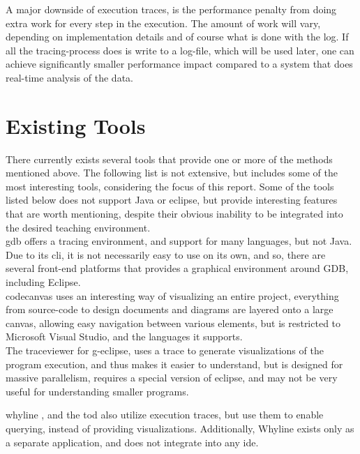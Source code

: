 A major downside of execution traces, is the performance penalty from doing extra work for every step in the execution.
The amount of work will vary, depending on implementation details and of course what is done with the log.
If all the tracing-process does is write to a log-file, which will be used later, one can achieve significantly smaller performance impact compared to a system that does real-time analysis of the data.
~\\

\section{Existing Tools}\label{PreTools}
There currently exists several tools that provide one or more of the methods mentioned above.
The following list is not extensive, but includes some of the most interesting tools, considering the focus of this report.
Some of the tools listed below does not support Java or eclipse, but provide interesting features that are worth mentioning, despite their obvious inability to be integrated into the desired teaching environment.
~\\

\gls{gdb} offers a tracing environment, and support for many languages, but not Java.
Due to its \gls{cli}, it is not necessarily easy to use on its own, and so, there are several front-end platforms that provides a graphical environment around GDB, including Eclipse.
~\\

\Gls{codecanvas} uses an interesting way of visualizing an entire project, everything from source-code to design documents and diagrams are layered onto a large canvas, allowing easy navigation between various elements, but is restricted to Microsoft Visual Studio, and the languages it supports.
~\\

The \gls{traceviewer} \cite{Kranzlmuller} for g-eclipse, uses a trace to generate visualizations of the program execution, and thus makes it easier to understand, but is designed for massive parallelism, requires a special version of eclipse, and may not be very useful for understanding smaller programs.
~\\

\begin{sloppypar}
\Gls{whyline} \cite{ko2009}, and the \gls{tod} \cite{Pothier2007} also utilize execution traces, but use them to enable querying, instead of providing visualizations.
Additionally, Whyline exists only as a separate application, and does not integrate into any \gls{ide}.
~\\
\end{sloppypar}

